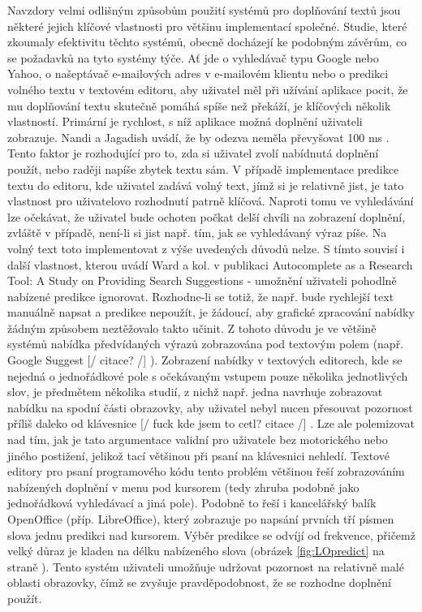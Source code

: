 \documentclass{article}
\begin{document}
Navzdory velmi odlišným způsobům použití systémů pro doplňování textů jsou některé jejich klíčové vlastnosti pro většinu implementací společné. Studie, které zkoumaly efektivitu těchto systémů, obecně docházejí ke podobným závěrům, co se požadavků na tyto systémy týče. Ať jde o vyhledávač typu Google nebo Yahoo, o našeptávač e-mailových adres v e-mailovém klientu nebo o predikci volného textu v textovém editoru, aby uživatel měl při užívání aplikace pocit, že mu doplňování textu skutečně pomáhá spíše než překáží, je klíčových několik vlastností.  Primární je rychlost, s níž aplikace možná doplnění uživateli zobrazuje. Nandi a Jagadish uvádí, že by odezva neměla převyšovat 100 ms \cite{Nandi2007}. Tento faktor je rozhodující pro to, zda si uživatel zvolí nabídnutá doplnění použít, nebo raději napíše zbytek textu sám. V případě implementace predikce textu do editoru, kde uživatel zadává volný text, jímž si je relativně jist, je tato vlastnost pro uživatelovo rozhodnutí patrně klíčová. Naproti tomu ve vyhledávání lze očekávat, že uživatel bude ochoten počkat delší chvíli na zobrazení doplnění, zvláště v případě, není-li si jist např. tím, jak se vyhledávaný výraz píše. Na volný text toto implementovat z výše uvedených důvodů nelze.  S tímto souvisí i další vlastnost, kterou uvádí Ward a kol. v publikaci Autocomplete as a Research Tool: A Study on Providing Search Suggestions - umožnění uživateli pohodlně nabízené predikce ignorovat. Rozhodne-li se totiž, že např. bude rychlejší text manuálně napsat a predikce nepoužít, je žádoucí, aby grafické zpracování nabídky žádným způsobem neztěžovalo takto učinit. Z tohoto důvodu je ve většině systémů nabídka předvídaných výrazů zobrazována pod textovým polem (např. Google Suggest 
[/ citace? /]
). Zobrazení nabídky v textových editorech, kde se nejedná o jednořádkové pole s očekávaným vstupem pouze několika jednotlivých slov, je předmětem několika studií, z nichž např. jedna navrhuje zobrazovat nabídku na spodní části obrazovky, aby uživatel nebyl nucen přesouvat pozornost příliš daleko od klávesnice 
[/ fuck kde jsem to cetl? citace /]
. Lze ale polemizovat nad tím, jak je tato argumentace validní pro uživatele bez motorického nebo jiného postižení, jelikož tací většinou při psaní na klávesnici nehledí. Textové editory pro psaní programového kódu tento problém většinou řeší zobrazováním nabízených doplnění v menu pod kursorem (tedy zhruba podobně jako jednořádková vyhledávací a jiná pole). Podobně to řeší i kancelářský balík OpenOffice (příp. LibreOffice), který zobrazuje po napsání prvních tří písmen slova jednu predikci nad kursorem. Výběr predikce se odvíjí od frekvence, přičemž velký důraz je kladen na délku nabízeného slova (obrázek \ref{fig:LOpredict} na straně \pageref{fig:LOpredict}). Tento systém uživateli umožňuje udržovat pozornost na relativně malé oblasti obrazovky, čímž se zvyšuje pravděpodobnost, že se rozhodne doplnění použít. 
\end{document}
